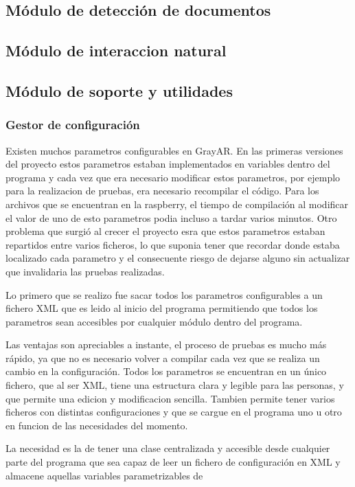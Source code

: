 \subsection{Módulo de detección de documentos}
\subsection{Módulo de interaccion natural}
\subsection{Módulo de soporte y utilidades}
\subsubsection{Gestor de configuración}
Existen muchos parametros configurables en GrayAR. En las primeras versiones del proyecto estos parametros estaban implementados en variables dentro del programa y cada vez que era necesario modificar estos parametros, por ejemplo para la realizacion de pruebas, era necesario recompilar el código. Para los archivos que se encuentran en la raspberry, el tiempo de compilación al modificar el valor de uno de esto parametros podia incluso a tardar varios minutos. Otro problema que surgió al crecer el proyecto esra que estos parametros estaban repartidos entre varios ficheros, lo que suponia tener que recordar donde estaba localizado cada parametro y el consecuente riesgo de dejarse alguno sin actualizar que invalidaria las pruebas realizadas.

Lo primero que se realizo fue sacar todos los parametros configurables a un fichero XML que es leido al inicio del programa permitiendo que todos los parametros sean accesibles por cualquier módulo dentro del programa.

Las ventajas son apreciables a instante, el proceso de pruebas es mucho más rápido, ya que no es necesario volver a compilar cada vez que se realiza un cambio en la configuración. Todos los parametros se encuentran en un único fichero, que al ser XML, tiene una estructura clara y legible para las personas, y que permite una edicion y modificacion sencilla. Tambien permite tener varios ficheros con distintas configuraciones y que se cargue en el programa uno u otro en funcion de las necesidades del momento.

  
La necesidad es la de tener una clase centralizada y accesible desde cualquier parte del programa que sea capaz de leer un fichero de configuración en XML y almacene aquellas variables parametrizables de

